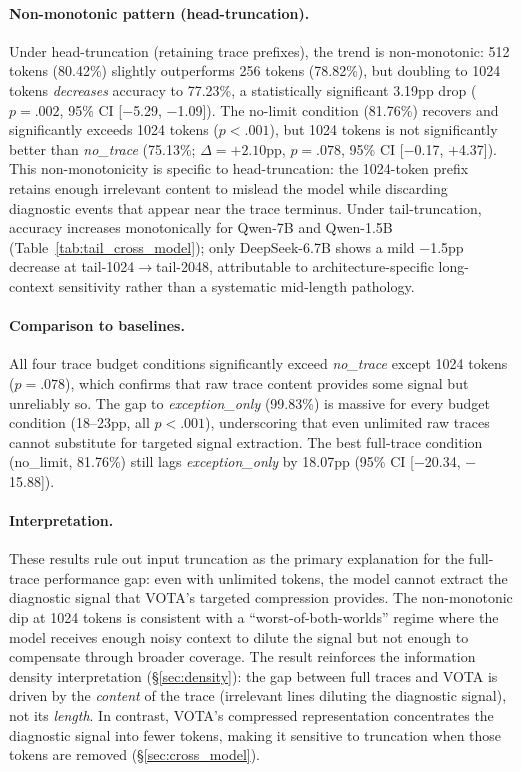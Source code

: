 \paragraph{Non-monotonic pattern (head-truncation).}
Under head-truncation (retaining trace prefixes), the trend is non-monotonic: 512 tokens (80.42\%) slightly outperforms 256 tokens (78.82\%), but doubling to 1024 tokens \emph{decreases} accuracy to 77.23\%, a statistically significant 3.19pp drop ($p{=}.002$, 95\% CI [$-$5.29, $-$1.09]).
The no-limit condition (81.76\%) recovers and significantly exceeds 1024 tokens ($p{<}.001$), but 1024 tokens is not significantly better than \textit{no\_trace} (75.13\%; $\Delta{=}{+}2.10$pp, $p{=}.078$, 95\% CI [$-$0.17, $+$4.37]).
This non-monotonicity is specific to head-truncation: the 1024-token prefix retains enough irrelevant content to mislead the model while discarding diagnostic events that appear near the trace terminus.
Under tail-truncation, accuracy increases monotonically for Qwen-7B and Qwen-1.5B (Table~\ref{tab:tail_cross_model}); only DeepSeek-6.7B shows a mild $-$1.5pp decrease at tail-1024$\to$tail-2048, attributable to architecture-specific long-context sensitivity rather than a systematic mid-length pathology.

\paragraph{Comparison to baselines.}
All four trace budget conditions significantly exceed \textit{no\_trace} except 1024 tokens ($p{=}.078$), which confirms that raw trace content provides some signal but unreliably so.
The gap to \textit{exception\_only} (99.83\%) is massive for every budget condition (18--23pp, all $p{<}.001$), underscoring that even unlimited raw traces cannot substitute for targeted signal extraction.
The best full-trace condition (no\_limit, 81.76\%) still lags \textit{exception\_only} by 18.07pp (95\% CI [$-$20.34, $-$15.88]).

\paragraph{Interpretation.}
These results rule out input truncation as the primary explanation for the full-trace performance gap: even with unlimited tokens, the model cannot extract the diagnostic signal that VOTA's targeted compression provides.
The non-monotonic dip at 1024 tokens is consistent with a ``worst-of-both-worlds'' regime where the model receives enough noisy context to dilute the signal but not enough to compensate through broader coverage.
The result reinforces the information density interpretation (\S\ref{sec:density}): the gap between full traces and VOTA is driven by the \emph{content} of the trace (irrelevant lines diluting the diagnostic signal), not its \emph{length}.
In contrast, VOTA's compressed representation concentrates the diagnostic signal into fewer tokens, making it sensitive to truncation when those tokens are removed (\S\ref{sec:cross_model}).

